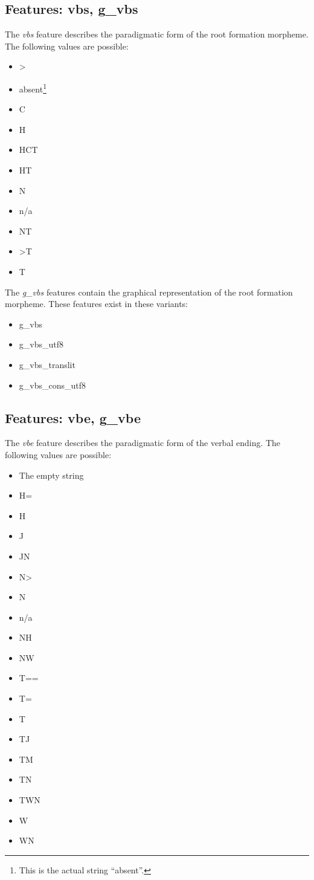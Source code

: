 \documentclass[11pt,oneside,a4paper]{memoir}
\begin{document}
\subsection{Features: vbs, g\_vbs}

The \emph{vbs} feature describes the paradigmatic form of the root formation morpheme. The following
values are possible:

\begin{itemize}
\item >
\item absent\footnote{This is the actual string ``absent''.}
\item C
\item H
\item HCT
\item HT
\item N
\item n/a
\item NT
\item >T
\item T
\end{itemize}

The \emph{g\_vbs} features contain the graphical representation of the root formation morpheme.
These features exist in these variants:

\begin{itemize}
\item g\_vbs
\item g\_vbs\_utf8
\item g\_vbs\_translit
\item g\_vbs\_cons\_utf8
\end{itemize}


\subsection{Features: vbe, g\_vbe}

The \emph{vbe} feature describes the paradigmatic form of the verbal ending. The following
values are possible:

\begin{itemize}
\item The empty string
\item H=
\item H
\item J
\item JN
\item N>
\item N
\item n/a
\item NH
\item NW
\item T==
\item T=
\item T
\item TJ
\item TM
\item TN
\item TWN
\item W
\item WN
\end{itemize}
\end{document}
